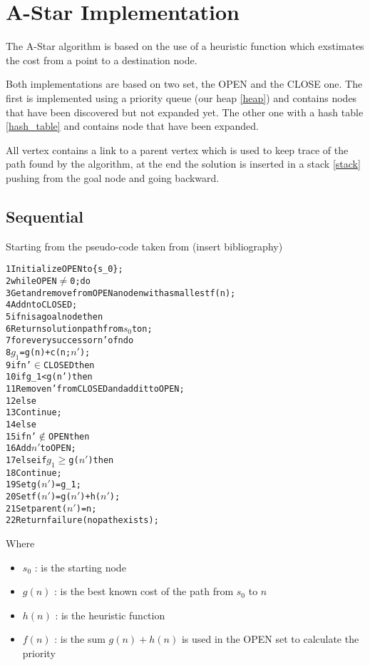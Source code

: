 \section{A-Star Implementation}
\label{Sec:implementation}

The A-Star algorithm is based on the use of a heuristic function which exstimates the cost from a point to a destination node.

Both implementations are based on two set, the OPEN and the CLOSE one. The first is implemented using a priority queue (our heap \ref{heap}) and contains nodes that have been discovered but not expanded yet. The other one with a hash table \ref{hash_table} and contains node that have been expanded.

All vertex contains a link to a parent vertex which is used to keep trace of the path found by the algorithm, at the end the solution is inserted in a stack \ref{stack} pushing from the goal node and going backward.

\subsection{Sequential}

Starting from the pseudo-code taken from (insert bibliography)

\begin{alltt}
    1 Initialize OPEN to \{s_0\};
    2 while OPEN \(\neq\) 0; do
    3 Get and remove from OPEN a node n with a smallest f(n);
    4 Add n to CLOSED;
    5 if n is a goal node then
    6   Return solution path from \(s_0\) to n;
    7 for every successor n' of n do
    8   $g_1$ = g(n) + c(n; \(n'\));
    9   if n' \(\in\) CLOSED then
    10      if g_1 < g(n') then
    11          Remove n' from CLOSED and add it to OPEN;
    12      else
    13          Continue;
    14  else
    15      if n' \(\notin\) OPEN then
    16          Add $n'$ to OPEN;
    17      else if $g_1$ \(\geq\) g($n'$) then
    18          Continue;
    19  Set g($n'$) = g_1;
    20  Set f($n'$) = g($n'$) + h($n'$);
    21  Set parent($n'$) = n;
    22 Return failure (no path exists);
\end{alltt}

Where
\begin{itemize}
    \item $s_0$ : is the starting node
    \item $g(n)$ : is the best known cost of the path from $s_0$ to $n$
    \item $h(n)$ : is the heuristic function
    \item $f(n)$ : is the sum $g(n) + h(n)$ is used in the OPEN set to calculate the priority
\end{itemize}

